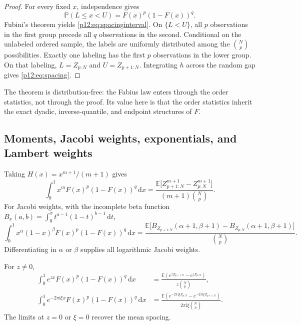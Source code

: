 \documentclass[11pt,oneside]{article}
\theoremstyle{definition}
\theoremstyle{remark}
\newcommand{\F}{F}
\newcommand{\E}{\mathbb E}
\newcommand{\Pp}{\mathbb P}
\newcommand{\dd}{\,\mathrm d}
\newcommand{\ii}{\mathrm i}
\newcommand{\1}{\mathbf 1}
\begin{document}
\begin{proof}
For every fixed \(x\), independence gives
\[
 \Pp(L\le x<U)=\F(x)^p(1-\F(x))^q.
\]
Fubini's theorem yields \eqref{p12:eq:spacinginterval}.  On \(\{L<U\}\), all
\(p\) observations in the first group precede all \(q\) observations in the
second.  Conditional on the unlabeled ordered sample, the labels are uniformly
distributed among the \(\binom Np\) possibilities.  Exactly one labeling has
the first \(p\) observations in the lower group.  On that labeling,
\(L=Z_{p:N}\) and \(U=Z_{p+1:N}\).  Integrating \(h\) across the random gap
gives \eqref{p12:eq:spacing}.
\end{proof}

The theorem is distribution-free: the Fabius law enters through the order
statistics, not through the proof.  Its value here is that the order statistics
inherit the exact dyadic, inverse-quantile, and endpoint structures of \(\F\).

\subsection{Moments, Jacobi weights, exponentials, and Lambert weights}

Taking \(H(x)=x^{m+1}/(m+1)\) gives
\begin{equation}\label{p12:eq:weightedmomspacing}
 \int_0^1x^m\F(x)^p(1-\F(x))^q\dd x
 =\frac{\E\bigl[Z_{p+1:N}^{m+1}-Z_{p:N}^{m+1}\bigr]}
 {(m+1)\binom Np}.
\end{equation}
For Jacobi weights, with the incomplete beta function
\(B_x(a,b)=\int_0^xt^{a-1}(1-t)^{b-1}\dd t\),
\begin{equation}\label{p12:eq:jacobispacing}
 \int_0^1x^\alpha(1-x)^\beta\F(x)^p(1-\F(x))^q\dd x
 =\frac{\E\bigl[B_{Z_{p+1:N}}(\alpha+1,\beta+1)
                    -B_{Z_{p:N}}(\alpha+1,\beta+1)\bigr]}
 {\binom Np}.
\end{equation}
Differentiating in \(\alpha\) or \(\beta\) supplies all logarithmic Jacobi
weights.

For \(z\ne0\),
\begin{align}
 \int_0^1e^{zx}\F(x)^p(1-\F(x))^q\dd x
 &=\frac{\E(e^{zZ_{p+1:N}}-e^{zZ_{p:N}})}
 {z\binom Np},\label{p12:eq:expspacing}\\
 \int_0^1e^{-2\pi\ii\xi x}\F(x)^p(1-\F(x))^q\dd x
 &=\frac{\E(e^{-2\pi\ii\xi Z_{p:N}}-e^{-2\pi\ii\xi Z_{p+1:N}})}
 {2\pi\ii\xi\binom Np}.\label{p12:eq:fourierspacing}
\end{align}
The limits at \(z=0\) or \(\xi=0\) recover the mean spacing.
\end{document}

